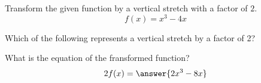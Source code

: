 \documentclass{ximera}
\author{Ivo Terek}
\begin{document}
Transform the given function by a vertical stretch with a factor of $2$.
\[
f(x)=x^3-4x
\]
\begin{exercise}
Which of the following represents a vertical stretch by a factor of 2?
\begin{multipleChoice}
\end{multipleChoice}

\begin{exercise}
What is the equation of the fransformed function?
\[
2f(x)=\answer{2x^3-8x}
\]
\end{exercise}
\end{exercise}
\end{document}
